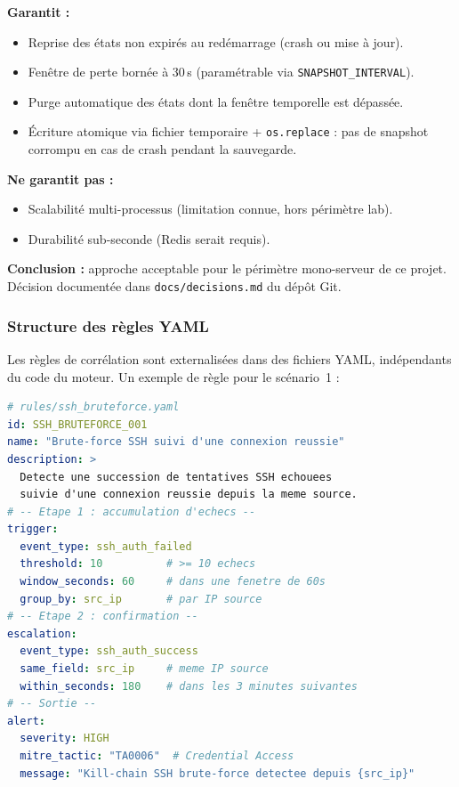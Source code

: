 \documentclass[11pt,a4paper]{article}
\begin{document}
\begin{infobox}[title={Ce que ce mécanisme garantit et ne garantit pas}]
\textbf{Garantit :}
\begin{itemize}[topsep=0pt]
  \item Reprise des états non expirés au redémarrage (crash ou mise à jour).
  \item Fenêtre de perte bornée à 30\,s (paramétrable via \texttt{SNAPSHOT\_INTERVAL}).
  \item Purge automatique des états dont la fenêtre temporelle est dépassée.
  \item Écriture atomique via fichier temporaire + \texttt{os.replace} :
        pas de snapshot corrompu en cas de crash pendant la sauvegarde.
\end{itemize}
\textbf{Ne garantit pas :}
\begin{itemize}[topsep=0pt]
  \item Scalabilité multi-processus (limitation connue, hors périmètre lab).
  \item Durabilité sub-seconde (Redis serait requis).
\end{itemize}
\textbf{Conclusion :} approche acceptable pour le périmètre mono-serveur de ce projet.
Décision documentée dans \texttt{docs/decisions.md} du dépôt Git.
\end{infobox}

\subsubsection{Structure des règles YAML}

Les règles de corrélation sont externalisées dans des fichiers YAML,
indépendants du code du moteur. Un exemple de règle pour le scénario~1 :

\begin{lstlisting}[language=YAML, caption={Règle YAML — Scénario 1 : brute-force SSH}]
# rules/ssh_bruteforce.yaml
id: SSH_BRUTEFORCE_001
name: "Brute-force SSH suivi d'une connexion reussie"
description: >
  Detecte une succession de tentatives SSH echouees
  suivie d'une connexion reussie depuis la meme source.
# -- Etape 1 : accumulation d'echecs --
trigger:
  event_type: ssh_auth_failed
  threshold: 10          # >= 10 echecs
  window_seconds: 60     # dans une fenetre de 60s
  group_by: src_ip       # par IP source
# -- Etape 2 : confirmation --
escalation:
  event_type: ssh_auth_success
  same_field: src_ip     # meme IP source
  within_seconds: 180    # dans les 3 minutes suivantes
# -- Sortie --
alert:
  severity: HIGH
  mitre_tactic: "TA0006"  # Credential Access
  message: "Kill-chain SSH brute-force detectee depuis {src_ip}"
\end{lstlisting}
\end{document}

